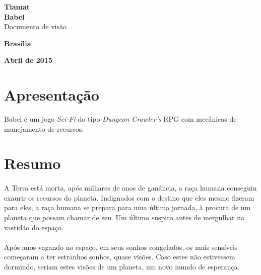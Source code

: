 \documentclass[11pt]{article} %
\begin{document}
\color{white}
\pagestyle{plain}

\begin{titlepage}
 \vfill
  \begin{center}
   {\large \textbf{Tiamat}} \\
   {\large \textbf{Babel}}\\[6cm]


   {\Large Documento de visão}\\[6cm]

   \hspace{.45\textwidth} %
  \vfill

\vspace{2cm}

\large \textbf{Brasília}

\large \textbf{Abril de 2015}
\end{center}
\end{titlepage}
\newpage

\color{white}
\section*{Apresentação}

Babel é um jogo \textit{Sci-Fi} do tipo \textit{Dungeon Crawler's} RPG com mecânicas de manejamento de recursos.

\section*{Resumo}

\paragraph{}A Terra está morta, após milhares de anos de ganância, a raça humana conseguiu exaurir os recursos do planeta.  Indignados com o destino que eles mesmo fizeram para eles, a raça humana se prepara para uma última jornada, à procura de um planeta que possam chamar de seu. Um  último suspiro antes de mergulhar na vastidão do espaço.

\paragraph{}Após anos vagando no espaço, em seus sonhos congelados, os mais sensíveis começaram a ter estranhos sonhos, quase visões. Caso estes não estivessem dormindo, seriam estes visões de um planeta, um novo mundo de esperança.
\end{document}
